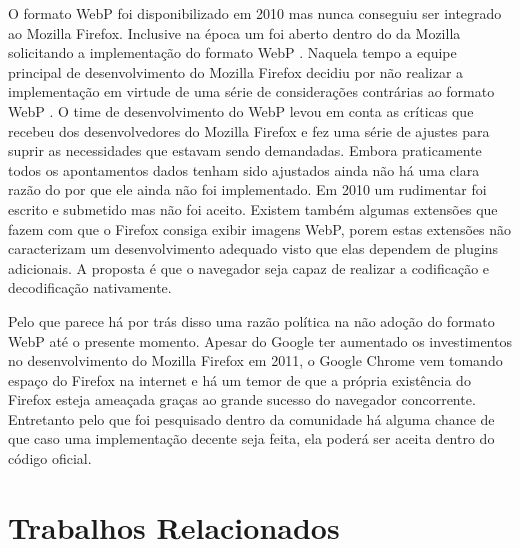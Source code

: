 \documentclass[espaco=simples,appendix=Name]{abnt}
\begin{document}
\begin{description}
\item \noindent

O formato WebP foi disponibilizado em 2010 mas nunca conseguiu ser integrado ao Mozilla Firefox. Inclusive na época um  foi aberto dentro do  da Mozilla solicitando a implementação do formato WebP \cite{FirefoxBug}. Naquela tempo a equipe principal de desenvolvimento do Mozilla Firefox decidiu por não realizar a implementação em virtude de uma série de considerações contrárias ao formato WebP \cite{WebPCritica}. O time de desenvolvimento do WebP levou em conta as críticas que recebeu dos desenvolvedores do Mozilla Firefox e fez uma série de ajustes para suprir as necessidades que estavam sendo demandadas. Embora praticamente todos os apontamentos dados tenham sido ajustados ainda não há uma clara razão do por que ele ainda não foi implementado. Em 2010 um  rudimentar foi escrito e submetido mas não foi aceito. Existem também algumas extensões que fazem com que o Firefox consiga exibir imagens WebP, porem estas extensões não caracterizam um desenvolvimento adequado visto que elas dependem de plugins adicionais. A proposta é que o navegador seja capaz de realizar a codificação e decodificação nativamente. 

Pelo que parece há por trás disso uma razão política na não adoção do formato WebP até o presente momento. Apesar do Google ter aumentado os investimentos no desenvolvimento do Mozilla Firefox em 2011, o Google Chrome vem tomando espaço do Firefox na internet e há um temor de que a própria existência do Firefox esteja ameaçada graças ao grande sucesso do navegador concorrente. Entretanto pelo que foi pesquisado dentro da comunidade há alguma chance de que caso uma implementação decente seja feita, ela poderá ser aceita dentro do código oficial.

\end{description}

\chapter{Trabalhos Relacionados}
\end{document}
